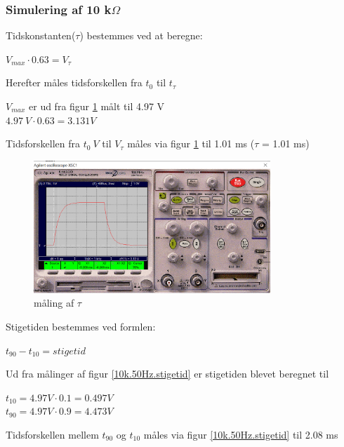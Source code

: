 \subsubsection{Simulering af 10 k$\Omega$ }
Tidskonstanten($\tau$) bestemmes ved at beregne:

\begin{center}
$V_{max} \cdot 0.63 = V_{\tau}$
\end{center}

Herefter måles tidsforskellen fra $t_0 $ til $t_{\tau}$

$V_{max}$ er ud fra figur \ref{10k.50Hz.tau} målt til 4.97 V
\\ 
$4.97 \ V \cdot 0.63 = 3.131 V$

Tidsforskellen fra $t_0 \ V$ til $V_{\tau}$ måles via figur \ref{10k.50Hz.tau} til 1.01 ms ($\tau$ = 1.01 ms)


\begin{figure}[h]
 \begin{center}
  \includegraphics[height=5cm]{P_Fig/figur3_10k_50Hz_tau.png}
  \caption{måling af $\tau$}
  \label{10k.50Hz.tau}
 \end{center}
\end{figure}

Stigetiden bestemmes ved formlen:
\begin{center}
$t_{90} - t_{10} = stigetid$
\end{center}

Ud fra målinger af figur \ref{10k.50Hz.stigetid}
er stigetiden blevet beregnet til

\begin{center}
$t_{10} = 4.97 V \cdot 0.1 = 0.497 V$
\\
$t_{90} = 4.97 V \cdot 0.9 = 4.473 V$
\end{center}

Tidsforskellen mellem $t_{90}$ og $t_{10}$ måles via figur \ref{10k.50Hz.stigetid} til 2.08 ms

